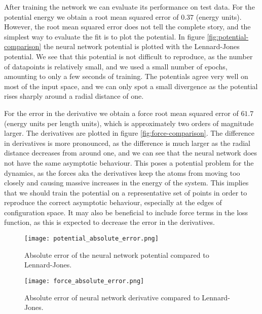 After training the network we can evaluate its performance
on test data. 
For the potential energy we obtain a root mean squared error of
$0.37$ (energy units).
However, the root mean squared error does not tell the complete story,
and the simplest way to evaluate the fit is to plot the potential.
In figure \ref{fig:potential-comparison} the neural network potential
is plotted with the Lennard-Jones potential.
We see that this potential is not difficult to reproduce,
as the number of datapoints is relatively small, and we used
a small number of epochs, amounting to only a few seconds of training.
The potentials agree very well on most of the input space, and we can
only spot a small divergence as the potential rises sharply
around a radial distance of one.

For the error in the derivative we obtain a force root mean squared error
of $61.7$ (energy units per length units), which is approximately two orders
of magnitude larger. The derivatives are plotted in figure
\ref{fig:force-comparison}.
The difference in derivatives is more pronounced, as the
difference is much larger as the radial distance decreases from
around one, and we can see that the neural network does not
have the same asymptotic behaviour. This poses a potential problem
for the dynamics, as the forces aka the derivatives keep
the atoms from moving too closely and causing massive
increases in the energy of the system.
This implies that we should train the potential on a representative
set of points in order to reproduce the correct asymptotic behaviour,
especially at the edges of configuration space.
It may also be beneficial to include force terms in the loss function,
as this is expected to decrease the error in the derivatives.

\begin{figure}[H]
    \centering
    \texttt{[image: potential\_absolute\_error.png]}
    \caption{Absolute error of the neural network potential compared
        to Lennard-Jones.}
    \label{fig:potential-rel-error}
\end{figure}

\begin{figure}[H]
    \centering
    \texttt{[image: force\_absolute\_error.png]}
    \caption{Absolute error of neural network derivative compared
        to Lennard-Jones.}
    \label{fig:force-rel-error}
\end{figure}

